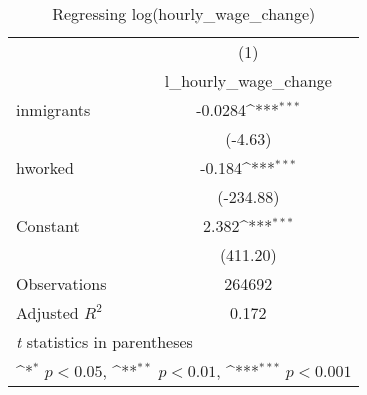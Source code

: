 \begin{table}[htbp]\centering
\def\sym#1{\ifmmode^{#1}\else\(^{#1}\)\fi}
\caption{Regressing log(hourly\_wage\_change)}
\begin{tabular}{l*{1}{c}}
\hline\hline
                    &\multicolumn{1}{c}{(1)}\\
                    &\multicolumn{1}{c}{l\_hourly\_wage\_change}\\
\hline
inmigrants          &     -0.0284\sym{***}\\
                    &     (-4.63)         \\
[1em]
hworked             &      -0.184\sym{***}\\
                    &   (-234.88)         \\
[1em]
Constant            &       2.382\sym{***}\\
                    &    (411.20)         \\
\hline
Observations        &      264692         \\
Adjusted \(R^{2}\)  &       0.172         \\
\hline\hline
\multicolumn{2}{l}{\footnotesize \textit{t} statistics in parentheses}\\
\multicolumn{2}{l}{\footnotesize \sym{*} \(p<0.05\), \sym{**} \(p<0.01\), \sym{***} \(p<0.001\)}\\
\end{tabular}
\end{table}
